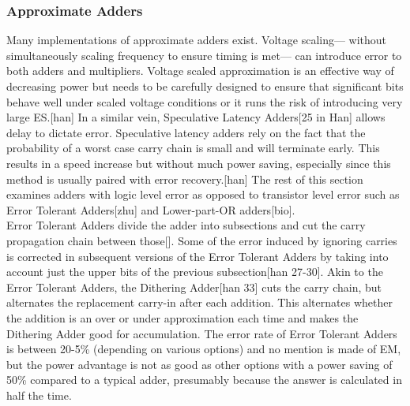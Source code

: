 \documentclass[journal]{IEEEtran}
\begin{document}
	\subsubsection{Approximate Adders}
	\indent Many implementations of approximate adders exist. Voltage scaling--- without simultaneously scaling frequency to ensure timing is met--- can introduce error to both adders and multipliers. Voltage scaled approximation is an effective way of decreasing power but needs to be carefully designed to ensure that significant bits behave well under scaled voltage conditions or it runs the risk of introducing very large ES.[han] In a similar vein, Speculative Latency Adders[25 in Han] allows delay to dictate error. Speculative latency adders rely on the fact that the probability of a worst case carry chain is small and will terminate early. This results in a speed increase but without much power saving, especially since this method is usually paired with error recovery.[han] The rest of this section examines adders with logic level error as opposed to transistor level error such as Error Tolerant Adders[zhu] and Lower-part-OR adders[bio]. \\
	\indent Error Tolerant Adders divide the adder into subsections and cut the carry propagation chain between those[]. Some of the error induced by ignoring carries is corrected in subsequent versions of the Error Tolerant Adders by taking into account just the upper bits of the previous subsection[han 27-30]. Akin to the Error Tolerant Adders, the Dithering Adder[han 33] cuts the carry chain, but alternates the replacement carry-in after each addition. This alternates whether the addition is an over or under approximation each time and makes the Dithering Adder good for accumulation. The error rate of Error Tolerant Adders is between 20-5\% (depending on various options) and no mention is made of EM, but the power advantage is not as good as other options with a power saving of 50\% compared to a typical adder, presumably because the answer is calculated in half the time.
\end{document}
